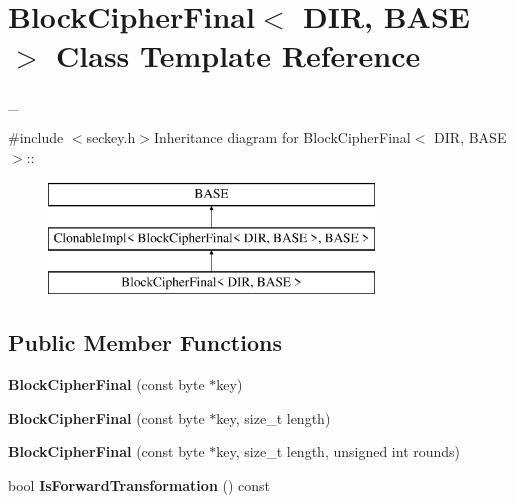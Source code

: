 \hypertarget{class_block_cipher_final}{
\section{BlockCipherFinal$<$ DIR, BASE $>$ Class Template Reference}
\label{class_block_cipher_final}
}


\_\-  


{\ttfamily \#include $<$seckey.h$>$}Inheritance diagram for BlockCipherFinal$<$ DIR, BASE $>$::\begin{figure}[H]
\begin{center}
\leavevmode
\includegraphics[height=3cm]{class_block_cipher_final}
\end{center}
\end{figure}
\subsection*{Public Member Functions}
\begin{DoxyCompactItemize}
\item 
\hypertarget{class_block_cipher_final_ac55f08ebf73f9ce14e3d2c8c3912a6c2}{
{\bfseries BlockCipherFinal} (const byte $\ast$key)}
\label{class_block_cipher_final_ac55f08ebf73f9ce14e3d2c8c3912a6c2}

\item 
\hypertarget{class_block_cipher_final_ae6c97b4e4bcf45216a1e79140ad6bc4b}{
{\bfseries BlockCipherFinal} (const byte $\ast$key, size\_\-t length)}
\label{class_block_cipher_final_ae6c97b4e4bcf45216a1e79140ad6bc4b}

\item 
\hypertarget{class_block_cipher_final_ad2de9298c032674fa6cd6bf94860edef}{
{\bfseries BlockCipherFinal} (const byte $\ast$key, size\_\-t length, unsigned int rounds)}
\label{class_block_cipher_final_ad2de9298c032674fa6cd6bf94860edef}

\item 
\hypertarget{class_block_cipher_final_acf2ff995cd139db5e0db4e08dca53b0b}{
bool {\bfseries IsForwardTransformation} () const }
\label{class_block_cipher_final_acf2ff995cd139db5e0db4e08dca53b0b}

\end{DoxyCompactItemize}


